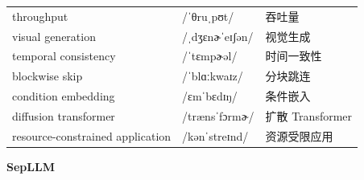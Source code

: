 \documentclass[UTF8,12pt,a4paper]{ctexart}
\providecommand{\zh}[1]{#1}
\begin{document}
\begin{tabular*}{\textwidth}{@{\extracolsep{\fill}}lll@{}}
throughput & {\ipafont /ˈθruˌpʊt/} & \zh{吞吐量} \\
visual generation & {\ipafont /ˌdʒɛnɚˈeɪʃən/} & \zh{视觉生成} \\
temporal consistency & {\ipafont /ˈtɛmpɚəl/} & \zh{时间一致性} \\
blockwise skip & {\ipafont /ˈblɑːkwaɪz/} & \zh{分块跳连} \\
condition embedding & {\ipafont /ɛmˈbɛdɪŋ/} & \zh{条件嵌入} \\
diffusion transformer & {\ipafont /trænsˈfɔrmɚ/} & \zh{扩散 Transformer} \\
resource-constrained application & {\ipafont /kənˈstreɪnd/} & \zh{资源受限应用} \\
\bottomrule
\end{tabular*}

\newpage

\begin{center}
    {\Large\bfseries SepLLM}
\end{center}
\end{document}

